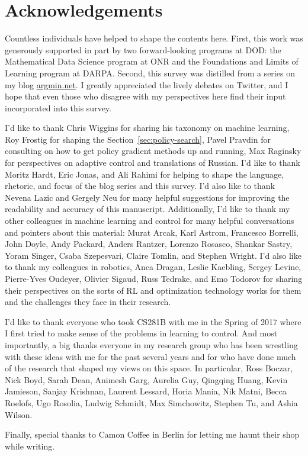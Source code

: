 \documentclass[11pt]{article}
\numberwithin{equation}{section}
\begin{document}
\section*{Acknowledgements}

Countless individuals have helped to shape the contents here. First, this work was generously supported in part by two forward-looking programs at DOD: the Mathematical Data Science program at ONR and the Foundations and Limits of Learning program at DARPA. Second, this survey was distilled from a series on my blog \url{argmin.net}. I greatly appreciated the lively debates on Twitter, and I hope that even those who disagree with my perspectives here find their input incorporated into this survey. 

I'd like to thank Chris Wiggins for sharing his taxonomy on machine learning, Roy Frostig for shaping the Section~\ref{sec:policy-search}, Pavel Pravdin for consulting on how to get policy gradient methods up and running, Max Raginsky for perspectives on adaptive control and translations of Russian. I'd like to thank Moritz Hardt, Eric Jonas, and Ali Rahimi for helping to shape the language, rhetoric, and focus of the blog series and this survey. I'd also like to thank Nevena Lazic and Gergely Neu for many helpful suggestions for improving the readability and accuracy of this manuscript.  Additionally, I'd like to thank my other colleagues in machine learning and control for many helpful conversations and pointers about this material: Murat Arcak, Karl Astrom, Francesco Borrelli, John Doyle, Andy Packard, Anders Rantzer, Lorenzo Rosasco, Shankar Sastry, Yoram Singer, Csaba Szepesvari, Claire Tomlin,  and Stephen Wright.  I'd also like to thank my colleagues  in robotics, Anca Dragan, Leslie Kaebling, Sergey Levine, Pierre-Yves Oudeyer, Olivier Sigaud, Russ Tedrake, and Emo Todorov for sharing their perspectives on the sorts of RL and optimization technology works for them and the challenges they face in their research.

I'd like to thank everyone who took CS281B with me in the Spring of 2017 where I first tried to make sense of the problems in learning to control. And most importantly, a big thanks everyone in my research group who has been wrestling with these ideas with me for the past several years and for who have done much of the research that shaped my views on this space. In particular, Ross Boczar, Nick Boyd, Sarah Dean, Animesh Garg, Aurelia Guy, Qingqing Huang, Kevin Jamieson, Sanjay Krishnan, Laurent Lessard, Horia Mania, Nik Matni, Becca Roelofs, Ugo Rosolia, Ludwig Schmidt, Max Simchowitz, Stephen Tu, and Ashia Wilson.

Finally, special thanks to Camon Coffee in Berlin for letting me haunt their shop while writing.

{\small


}
\end{document}

